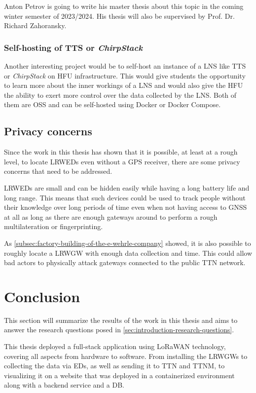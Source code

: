 Anton Petrov is going to write his master thesis about this topic in the coming winter semester of 2023/2024.
His thesis will also be supervised by Prof. Dr. Richard Zahoransky.

\subsubsection{Self-hosting of \acl{TTS} or \emph{ChirpStack}}

Another interesting project would be to self-host an instance of a \ac{LNS} like \ac{TTS} or \emph{ChirpStack} on \ac{HFU} infrastructure.
This would give students the opportunity to learn more about the inner workings of a \ac{LNS} and would also give the \ac{HFU} the ability to exert more control over the data collected by the \ac{LNS}.
Both of them are \ac{OSS} and can be self-hosted using Docker or Docker Compose.

\subsection{Privacy concerns}

Since the work in this thesis has shown that it is possible, at least at a rough level, to locate \aclp{LRWED} even without a \ac{GPS} receiver, there are some privacy concerns that need to be addressed.

\aclp{LRWED} are small and can be hidden easily while having a long battery life and long range.
This means that such devices could be used to track people without their knowledge over long periods of time even when not having access to \ac{GNSS} at all as long as there are enough gateways around to perform a rough multilateration or fingerprinting.

As \cref{subsec:factory-building-of-the-e-wehrle-company} showed, it is also possible to roughly locate a \acl{LRWGW} with enough data collection and time.
This could allow bad actors to physically attack gateways connected to the public \ac{TTN} network.

\section{Conclusion}

This section will summarize the results of the work in this thesis and aims to answer the research questions posed in \cref{sec:introduction-research-questions}.

This thesis deployed a full-stack application using \ac{LoRaWAN} technology, covering all aspects from hardware to software.
From installing the \aclp{LRWGW} to collecting the data via \aclp{ED}, as well as sending it to \ac{TTN} and \ac{TTNM}, to visualizing it on a website that was deployed in a containerized environment along with a backend service and a \ac{DB}.

